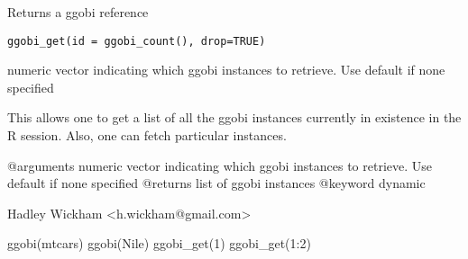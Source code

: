 \begin{Description}\relax
Returns a ggobi reference
\end{Description}
\begin{Usage}
\begin{verbatim}ggobi_get(id = ggobi_count(), drop=TRUE)\end{verbatim}
\end{Usage}
\begin{Arguments}
\begin{ldescription}
\item[\code{id}] numeric vector indicating which ggobi instances to retrieve.  Use default if none specified
\item[\code{drop}] 
\end{ldescription}
\end{Arguments}
\begin{Details}\relax
This allows one to get a list of all the ggobi instances currently
in existence in the R session.  Also, one can fetch particular instances.

@arguments numeric vector indicating which ggobi instances to retrieve.  Use default if none specified
@returns list of ggobi instances
@keyword dynamic
\end{Details}
\begin{Author}\relax
Hadley Wickham <h.wickham@gmail.com>
\end{Author}
\begin{Examples}
\begin{ExampleCode}ggobi(mtcars)
ggobi(Nile)
ggobi_get(1)
ggobi_get(1:2)\end{ExampleCode}
\end{Examples}

